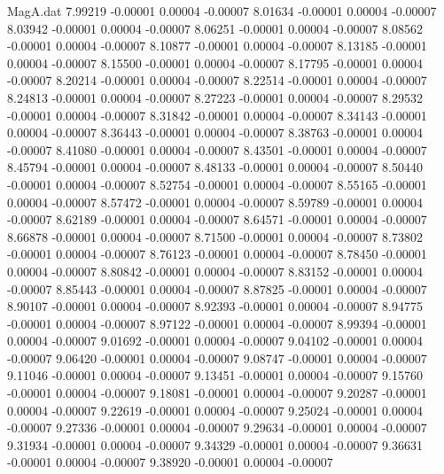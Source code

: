 \begin{filecontents}{MagA.dat}
   7.99219   -0.00001    0.00004   -0.00007
   8.01634   -0.00001    0.00004   -0.00007
   8.03942   -0.00001    0.00004   -0.00007
   8.06251   -0.00001    0.00004   -0.00007
   8.08562   -0.00001    0.00004   -0.00007
   8.10877   -0.00001    0.00004   -0.00007
   8.13185   -0.00001    0.00004   -0.00007
   8.15500   -0.00001    0.00004   -0.00007
   8.17795   -0.00001    0.00004   -0.00007
   8.20214   -0.00001    0.00004   -0.00007
   8.22514   -0.00001    0.00004   -0.00007
   8.24813   -0.00001    0.00004   -0.00007
   8.27223   -0.00001    0.00004   -0.00007
   8.29532   -0.00001    0.00004   -0.00007
   8.31842   -0.00001    0.00004   -0.00007
   8.34143   -0.00001    0.00004   -0.00007
   8.36443   -0.00001    0.00004   -0.00007
   8.38763   -0.00001    0.00004   -0.00007
   8.41080   -0.00001    0.00004   -0.00007
   8.43501   -0.00001    0.00004   -0.00007
   8.45794   -0.00001    0.00004   -0.00007
   8.48133   -0.00001    0.00004   -0.00007
   8.50440   -0.00001    0.00004   -0.00007
   8.52754   -0.00001    0.00004   -0.00007
   8.55165   -0.00001    0.00004   -0.00007
   8.57472   -0.00001    0.00004   -0.00007
   8.59789   -0.00001    0.00004   -0.00007
   8.62189   -0.00001    0.00004   -0.00007
   8.64571   -0.00001    0.00004   -0.00007
   8.66878   -0.00001    0.00004   -0.00007
   8.71500   -0.00001    0.00004   -0.00007
   8.73802   -0.00001    0.00004   -0.00007
   8.76123   -0.00001    0.00004   -0.00007
   8.78450   -0.00001    0.00004   -0.00007
   8.80842   -0.00001    0.00004   -0.00007
   8.83152   -0.00001    0.00004   -0.00007
   8.85443   -0.00001    0.00004   -0.00007
   8.87825   -0.00001    0.00004   -0.00007
   8.90107   -0.00001    0.00004   -0.00007
   8.92393   -0.00001    0.00004   -0.00007
   8.94775   -0.00001    0.00004   -0.00007
   8.97122   -0.00001    0.00004   -0.00007
   8.99394   -0.00001    0.00004   -0.00007
   9.01692   -0.00001    0.00004   -0.00007
   9.04102   -0.00001    0.00004   -0.00007
   9.06420   -0.00001    0.00004   -0.00007
   9.08747   -0.00001    0.00004   -0.00007
   9.11046   -0.00001    0.00004   -0.00007
   9.13451   -0.00001    0.00004   -0.00007
   9.15760   -0.00001    0.00004   -0.00007
   9.18081   -0.00001    0.00004   -0.00007
   9.20287   -0.00001    0.00004   -0.00007
   9.22619   -0.00001    0.00004   -0.00007
   9.25024   -0.00001    0.00004   -0.00007
   9.27336   -0.00001    0.00004   -0.00007
   9.29634   -0.00001    0.00004   -0.00007
   9.31934   -0.00001    0.00004   -0.00007
   9.34329   -0.00001    0.00004   -0.00007
   9.36631   -0.00001    0.00004   -0.00007
   9.38920   -0.00001    0.00004   -0.00007

\end{filecontents}
